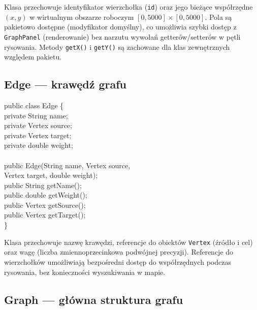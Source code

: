 \documentclass[a4paper, 11pt]{article}
\begin{document}
Klasa przechowuje identyfikator wierzchołka (\texttt{id}) oraz jego
bieżące współrzędne $(x, y)$ w wirtualnym obszarze roboczym
$[0, 5000] \times [0, 5000]$. Pola są pakietowo dostępne (modyfikator
domyślny), co umożliwia szybki dostęp z \texttt{GraphPanel} (renderowanie)
bez narzutu wywołań getterów/setterów w pętli rysowania. Metody
\texttt{getX()} i \texttt{getY()} są zachowane dla klas zewnętrznych
względem pakietu.

\subsection{Edge --- krawędź grafu}

\begin{filebox}
public class Edge \{\\
\quad private String name;\\
\quad private Vertex source;\\
\quad private Vertex target;\\
\quad private double weight;\\
\\
\quad public Edge(String name, Vertex source,\\
\quad \qquad\qquad\; Vertex target, double weight);\\
\quad public String getName();\\
\quad public double getWeight();\\
\quad public Vertex getSource();\\
\quad public Vertex getTarget();\\
\}
\end{filebox}

Klasa przechowuje nazwę krawędzi, referencje do obiektów \texttt{Vertex}
(źródło i cel) oraz wagę (liczba zmiennoprzecinkowa podwójnej precyzji).
Referencje do wierzchołków umożliwiają bezpośredni dostęp do współrzędnych
podczas rysowania, bez konieczności wyszukiwania w mapie.

\subsection{Graph --- główna struktura grafu}
\end{document}
